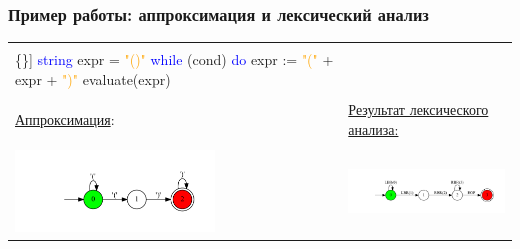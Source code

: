 \documentclass{beamer}
\begin{document}
\begin{frame}[fragile]
    \transwipe[direction=90]
    \frametitle{Пример работы: аппроксимация и лексический анализ}    
\begin{center}
    \begin{tabular}{p{6cm}|p{6cm}}
    \begin{minipage}{3in}

        \begin{Verbatim}[commandchars=\\\{\}]
\textcolor{blue}{string} expr = \textcolor{orange}{"()"}
\textcolor{blue}{while} (cond) \textcolor{blue}{do} 
    expr := \textcolor{orange}{"("} + expr + \textcolor{orange}{")"}
evaluate(expr)  
        \end{Verbatim}
    \end{minipage}
&
\\ &
\\     
\underline{Аппроксимация}: & \underline{Результат лексического анализа:}
\\ &
\\
\includegraphics[width=150pt]{pictures/in3_appr.pdf}
&
\includegraphics[width=160pt]{pictures/in3.pdf}

    \end{tabular}
\end{center}
\end{frame}
\end{document}
